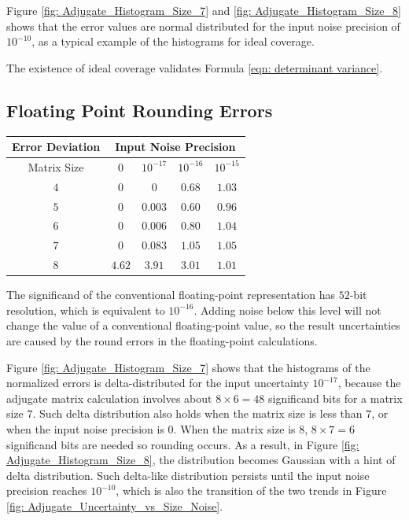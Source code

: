 \documentclass[twoside]{article}
\numberwithin{equation}{section}
\begin{document}
Figure \ref{fig: Adjugate_Histogram_Size_7} and \ref{fig: Adjugate_Histogram_Size_8} shows that the error values are normal distributed for the input noise precision of  $10^{-10}$, as a typical example of the histograms for ideal coverage.

The existence of ideal coverage validates Formula \eqref{eqn: determinant variance}.


\subsection{Floating Point Rounding Errors}

\begin{table}
\centering
\begin{tabular}{|c|c|c|c|c|} 
\hline 
Error Deviation & \multicolumn{4}{|c|}{Input Noise Precision}  \\ 
\hline 
Matrix Size & $0$ & $10^{-17}$ & $10^{-16}$ & $10^{-15}$ \\ 
\hline 
$4$ & $0$     &       $0$ & $0.68$ & $1.03$ \\
\hline 
$5$ & $0$     & $0.003$ & $0.60$ & $0.96$ \\
\hline 
$6$ & $0$     & $0.006$ & $0.80$ & $1.04$ \\
\hline 
$7$ & $0$     & $0.083$ & $1.05$ & $1.05$ \\
\hline 
$8$ & $4.62$ & $3.91$  & $3.01$ & $1.01$ \\
\hline 
\end{tabular}
\label{tbl: matrix rounding errors}
\end{table}


The significand of the conventional floating-point representation \cite{Floating_Point_Standard} has $52$-bit resolution, which is equivalent to $10^{-16}$.
Adding noise below this level will not change the value of a conventional floating-point value, so the result uncertainties are caused by the round errors in the floating-point calculations.

Figure \ref{fig: Adjugate_Histogram_Size_7} shows that the histograms of the normalized errors is delta-distributed for the input uncertainty $10^{-17}$, because the adjugate matrix calculation involves about $8 \times 6 = 48$ significand bits for a matrix size $7$.
Such delta distribution also holds when the matrix size is less than $7$, or when the input noise precision is $0$.
When the matrix size is $8$, $8 \times 7 = 6$ significand bits are needed so rounding occurs.
As a result, in Figure \ref{fig: Adjugate_Histogram_Size_8}, the distribution becomes Gaussian with a hint of delta distribution.
Such delta-like distribution persists until the input noise precision reaches $10^{-10}$, which is also the transition of the two trends in Figure \ref{fig: Adjugate_Uncertainty_vs_Size_Noise}.
\end{document}
